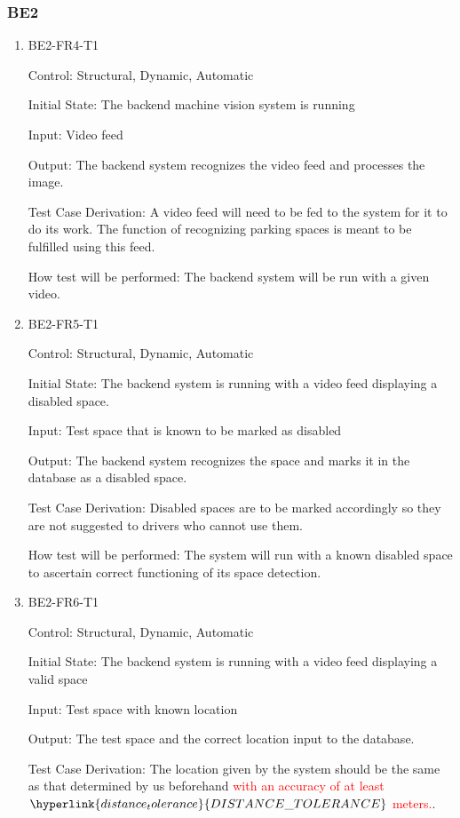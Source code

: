 \documentclass[12pt, titlepage]{article}
\begin{document}
\subsubsection{BE2}

\begin{enumerate}

\item{BE2-FR4-T1}

Control: Structural, Dynamic, Automatic
					
Initial State: The backend machine vision system is running
					
Input: Video feed
					
Output: The backend system recognizes the video feed and processes the image.

Test Case Derivation: A video feed will need to be fed to the system for it to
do its work. The function of recognizing parking spaces is meant to be fulfilled
using this feed.
					
How test will be performed: The backend system will be run with a given video.

\item{BE2-FR5-T1}

Control: Structural, Dynamic, Automatic
					
Initial State: The backend system is running with a video feed displaying a
disabled space.
					
Input: Test space that is known to be marked as disabled
					
Output: The backend system recognizes the space and marks it in the database as
a disabled space.

Test Case Derivation: Disabled spaces are to be marked accordingly so they are
not suggested to drivers who cannot use them.
					
How test will be performed: The system will run with a known disabled space to
ascertain correct functioning of its space detection.

\item{BE2-FR6-T1}

Control: Structural, Dynamic, Automatic
					
Initial State: The backend system is running with a video feed displaying a
valid space
					
Input: Test space with known location
					
Output: The test space and the correct location input to the database.

Test Case Derivation: The location given by the system should be the same as
that determined by us beforehand \textcolor{red}{with an accuracy of at least
$\hyperlink{distance_tolerance}{DISTANCE\_TOLERANCE}$ meters.}.
					

\end{enumerate}
\end{document}
